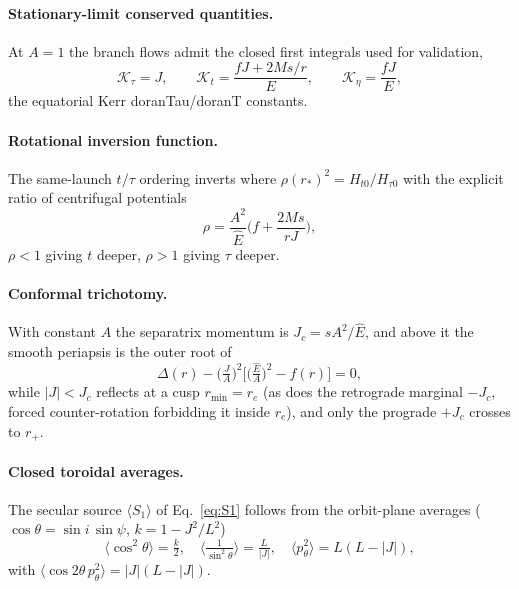 \documentclass[
    aps, prd, twocolumn, superscriptaddress,
    showpacs, nofootinbib, floatfix
]{revtex4-2}
\newcommand{\Ehat}{\hat E}
\newcommand{\rp}{r_{+}}
\newcommand{\re}{r_{e}}
\newcommand{\Jc}{J_{c}}
\begin{document}
\paragraph{Stationary-limit conserved quantities.} At $A=1$ the branch flows admit
the closed first integrals used for validation,
\begin{equation}
    \mathcal K_\tau=J,\qquad
    \mathcal K_t=\frac{fJ+2Ms/r}{E},\qquad
    \mathcal K_\eta=\frac{fJ}{E},
    \label{eq:kerr-conserved}
\end{equation}
the equatorial Kerr doranTau/doranT constants.

\paragraph{Rotational inversion function.} The same-launch $t/\tau$ ordering
inverts where $\rho(r_*)^2=H_{t0}/H_{\tau0}$ with the explicit ratio of
centrifugal potentials
\begin{equation}
    \rho=\frac{A^2}{\Ehat}\Big(f+\frac{2Ms}{rJ}\Big),
    \label{eq:rho-explicit}
\end{equation}
$\rho<1$ giving $t$ deeper, $\rho>1$ giving $\tau$ deeper.

\paragraph{Conformal trichotomy.} With constant $A$ the separatrix momentum is
$\Jc=sA^2/\Ehat$, and above it the smooth periapsis is the outer root of
\begin{equation}
    \Delta(r)-\Big(\tfrac{J}{A}\Big)^2\Big[\big(\tfrac{\Ehat}{A}\big)^2-f(r)\Big]=0,
    \label{eq:periapsis-root}
\end{equation}
while $|J|<\Jc$ reflects at a cusp $r_{\min}=\re$ (as does the retrograde
marginal $-\Jc$, forced counter-rotation forbidding it inside $\re$), and only
the prograde $+\Jc$ crosses to $\rp$.

\paragraph{Closed toroidal averages.} The secular source $\langle S_1\rangle$ of
Eq.~\eqref{eq:S1} follows from the orbit-plane averages ($\cos\theta=\sin i\,
\sin\psi$, $k=1-J^2/L^2$)
\begin{equation}
    \Big\langle\cos^2\theta\Big\rangle=\tfrac{k}{2},\quad
    \Big\langle\tfrac{1}{\sin^2\theta}\Big\rangle=\tfrac{L}{|J|},\quad
    \big\langle p_\theta^2\big\rangle=L(L-|J|),
    \label{eq:averages}
\end{equation}
with $\langle\cos2\theta\,p_\theta^2\rangle=|J|(L-|J|)$.
\end{document}
